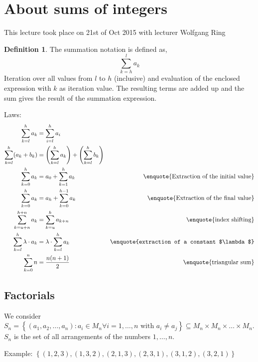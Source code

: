 \documentclass[a4paper,landscape,twocolumn]{article}
\theoremstyle{definition}
\newtheorem{defi}{Definition}
\newcommand\set[1]{\left\{#1\right\}}
\newcommand\meta[3]{\begin{mdframed}[skipbelow=4pt,skipabove=4pt,innermargin=1pt,innerleftmargin=1pt,innerrightmargin=1pt]\begin{center}\small{\textdownarrow{} This #1 took place on #2 with lecturer #3}\end{center}\end{mdframed}}
\begin{document}
\section{About sums of integers}
\meta{lecture}{21st of Oct 2015}{Wolfgang Ring}

\begin{defi}
  The summation notation is defined as,
  \[ \sum_{k=h}^{l} a_k \]
  Iteration over all values from $l$ to $h$ (inclusive) and evaluation of
  the enclosed expression with $k$ as iteration value. The resulting terms
  are added up and the sum gives the result of the summation expression.
\end{defi}

Laws:
\begin{align}
    \sum_{k=l}^{h} a_k &= \sum_{i=l}^h a_i \\
    \sum_{k=l}^{h} (a_k + b_k)
        &= \left(\sum_{k=l}^h a_k\right) + \left(\sum_{k=l}^h b_k\right) \\
    \sum_{k=0}^{h} a_k
        &= a_0 + \sum_{k=1}^{h} a_k
        & \text{\enquote{Extraction of the initial value}} \\
    \sum_{k=0}^{h} a_k
        &= a_{h} + \sum_{k=0}^{h-1} a_k
        & \text{\enquote{Extraction of the final value}} \\
    \sum_{k=u+n}^{h+n} a_k
        &= \sum_{k=u}^{h} a_{k+n}
        & \text{\enquote{index shifting}} \\
    \sum_{k=l}^h \lambda \cdot a_k
        &= \lambda \cdot \sum_{k=l}^h a_k
        & \text{\enquote{extraction of a constant $\lambda$}} \\
    \sum_{k=0}^n n
        &= \frac{n (n+1)}{2}
        & \text{\enquote{triangular sum}}
\end{align}

\subsection{Factorials}
%
We consider $S_n = \set{(a_1, a_2, \ldots, a_n): a_i \in M_n \forall i = 1, \ldots, n
\text{ with } a_i \neq a_j} \subseteq M_n \times M_n \times \dots \times M_n$.
$S_n$ is the set of all arrangements of the numbers $1, \ldots, n$.

Example: $\set{(1,2,3), (1, 3, 2), (2, 1, 3), (2, 3, 1), (3, 1, 2), (3, 2, 1)}$
\end{document}
